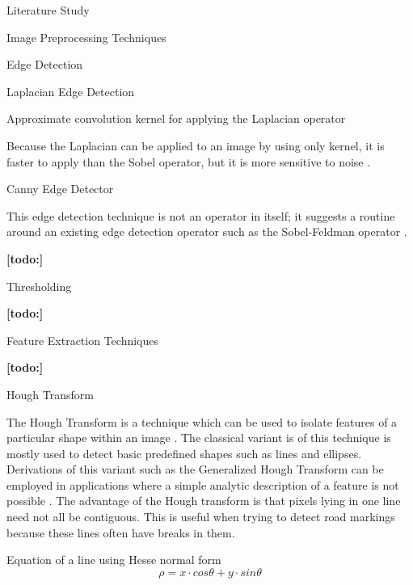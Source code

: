 \documentclass{matthijs}
\begin{document}
\begin{hoofdstuk}{Literature Study}
\begin{paragraaf}{Image Preprocessing Techniques}
\begin{subparagraaf}{Edge Detection}
\begin{subsubparagraaf}{Laplacian Edge Detection}
\begin{figuur}{Approximate convolution kernel for applying the Laplacian operator}
						\cite{tai2008fast}
					\end{figuur}

					Because the Laplacian can be applied to an image by using only kernel, it is faster to apply than the Sobel operator, but it is more sensitive to noise \cite{sinha2017sobel}.
				\end{subsubparagraaf}

				\begin{subsubparagraaf}{Canny Edge Detector}

					This edge detection technique is not an operator in itself; it suggests a routine around an existing edge detection operator such as the Sobel-Feldman operator \cite{canny1986computational}.

					\textbf{[todo:]}

				\end{subsubparagraaf}

			\end{subparagraaf}

			\begin{subparagraaf}{Thresholding}

				\textbf{[todo:]}

			\end{subparagraaf}

		\end{paragraaf}

		\begin{paragraaf}{Feature Extraction Techniques}

			\textbf{[todo:]}

			\begin{subparagraaf}{Hough Transform}

				The Hough Transform is a technique which can be used to isolate features of a particular shape within an image \cite{fisher2003hypermedia}.
				The classical variant is of this technique is mostly used to detect basic predefined shapes such as lines and ellipses.
				Derivations of this variant such as the Generalized Hough Transform can be employed in applications where a simple analytic description of a feature is not possible \cite{fisher2003hypermedia}.
				The advantage of the Hough transform is that pixels lying in one line need not all be contiguous.\cite{kahl2000hough}
				This is useful when trying to detect road markings because these lines often have breaks in them.

				\begin{figuur}{Equation of a line using Hesse normal form}
					\begin{equation*}
						\rho = x \cdot cos \theta + y \cdot sin \theta
					\end{equation*}\cite{caltech2009line}
				\end{figuur}


\end{subparagraaf}
\end{paragraaf}
\end{hoofdstuk}
\end{document}
